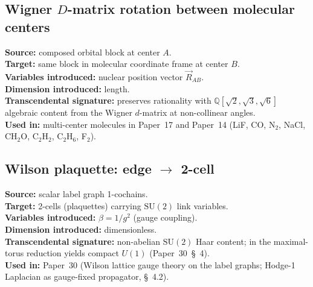\documentclass[11pt]{article}
\begin{document}
\subsection{Wigner $D$-matrix rotation between molecular centers}
\label{sec:proj_wignerD}
\textbf{Source:} composed orbital block at center $A$.\\
\textbf{Target:} same block in molecular coordinate frame at center
$B$.\\
\textbf{Variables introduced:} nuclear position vector
$\vec{R}_{AB}$.\\
\textbf{Dimension introduced:} length.\\
\textbf{Transcendental signature:} preserves rationality with
$\mathbb{Q}[\sqrt{2}, \sqrt{3}, \sqrt{6}]$ algebraic content from
the Wigner $d$-matrix at non-collinear angles.\\
\textbf{Used in:} multi-center molecules in Paper~17 and Paper~14
(LiF, CO, N$_2$, NaCl, CH$_2$O, C$_2$H$_2$, C$_2$H$_6$, F$_2$).

\subsection{Wilson plaquette: edge $\to$ 2-cell}
\label{sec:proj_wilson}
\textbf{Source:} scalar label graph 1-cochains.\\
\textbf{Target:} 2-cells (plaquettes) carrying $\mathrm{SU}(2)$ link
variables.\\
\textbf{Variables introduced:} $\beta = 1/g^2$ (gauge coupling).\\
\textbf{Dimension introduced:} dimensionless.\\
\textbf{Transcendental signature:} non-abelian $\mathrm{SU}(2)$ Haar
content; in the maximal-torus reduction yields compact $U(1)$
(Paper~30~\S~4).\\
\textbf{Used in:} Paper~30 (Wilson lattice gauge theory on the label
graphs; Hodge-1 Laplacian as gauge-fixed propagator, \S~4.2).
\end{document}
